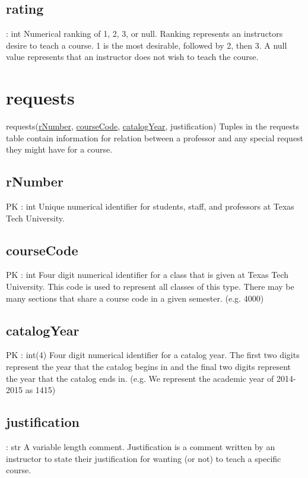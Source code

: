 	\subsection{rating}
		: int 
		Numerical ranking of 1, 2, 3, or null. Ranking represents an instructors desire to teach a course. 1 is the most desirable, followed by 2, then 3. A null value represents that an instructor does not wish to teach the course. 


\section{requests}
	requests(\underline{rNumber}, \underline{courseCode}, \underline{catalogYear}, justification) 
		Tuples in the requests table contain information for relation between a professor and any special request they might have for a course.
	
	\subsection{rNumber}
		PK : int
		Unique numerical identifier for students, staff, and professors at Texas Tech University.
	
	\subsection{courseCode}
		PK : int
		Four digit numerical identifier for a class that is given at Texas Tech University. This code is used to represent all classes of this type. There may be many sections that share a course code in a given semester. (e.g. 4000)
	
	\subsection{catalogYear}
		PK : int(4) 
		Four digit numerical identifier for a catalog year. The first two digits represent the year that the catalog begins in and the final two digits represent the year that the catalog ends in. (e.g. We represent the academic year of 2014-2015 as 1415)
	
	\subsection{justification}
		: str
		A variable length comment. Justification is a comment written by an instructor to state their justification for wanting (or not) to teach a specific course. 


